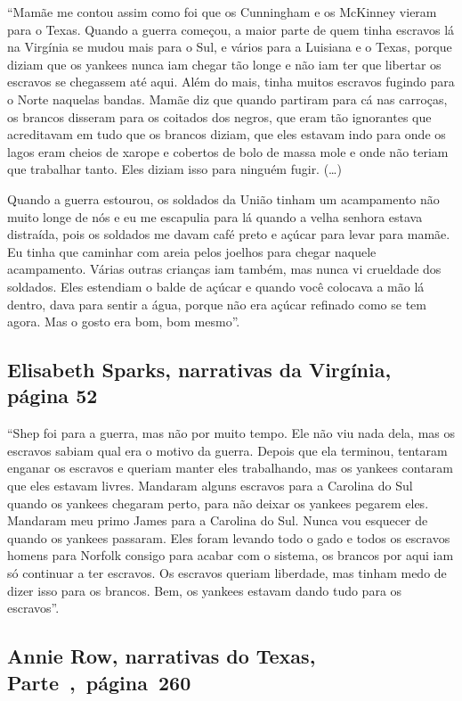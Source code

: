 ``Mamãe me contou assim como foi que os Cunningham e os McKinney vieram
para o Texas. Quando a guerra começou, a maior parte de quem tinha
escravos lá na Virgínia se mudou mais para o Sul, e vários para a
Luisiana e o Texas, porque diziam que os yankees nunca iam chegar tão
longe e não iam ter que libertar os escravos se chegassem até aqui. Além
do mais, tinha muitos escravos fugindo para o Norte naquelas bandas.
Mamãe diz que quando partiram para cá nas carroças, os brancos disseram
para os coitados dos negros, que eram tão ignorantes que acreditavam em
tudo que os brancos diziam, que eles estavam indo para onde os lagos
eram cheios de xarope e cobertos de bolo de massa mole e onde não teriam
que trabalhar tanto. Eles diziam isso para ninguém fugir. (\ldots{})

Quando a guerra estourou, os soldados da União tinham um acampamento não
muito longe de nós e eu me escapulia para lá quando a velha senhora
estava distraída, pois os soldados me davam café preto e açúcar para
levar para mamãe. Eu tinha que caminhar com areia pelos joelhos para
chegar naquele acampamento. Várias outras crianças iam também, mas nunca
vi crueldade dos soldados. Eles estendiam o balde de açúcar e quando
você colocava a mão lá dentro, dava para sentir a água, porque não era
açúcar refinado como se tem agora. Mas o gosto era bom, bom mesmo''.

\subsection{Elisabeth Sparks, narrativas da Virgínia, página 52}
\label{ref252} 

``Shep foi para a guerra, mas não por muito tempo. Ele não viu nada
dela, mas os escravos sabiam qual era o motivo da guerra. Depois que ela
terminou, tentaram enganar os escravos e queriam manter eles
trabalhando, mas os yankees contaram que eles estavam livres. Mandaram
alguns escravos para a Carolina do Sul quando os yankees chegaram
perto, para não deixar os yankees pegarem eles. Mandaram meu primo James
para a Carolina do Sul. Nunca vou esquecer de quando os yankees
passaram. Eles foram levando todo o gado e todos os escravos homens para
Norfolk consigo para acabar com o sistema, os brancos por aqui iam só
continuar a ter escravos. Os escravos queriam liberdade, mas tinham medo
de dizer isso para os brancos. Bem, os yankees estavam dando tudo para
os escravos''.

\subsection{Annie Row, narrativas do Texas, Parte~,~página~260}
\label{ref231}

